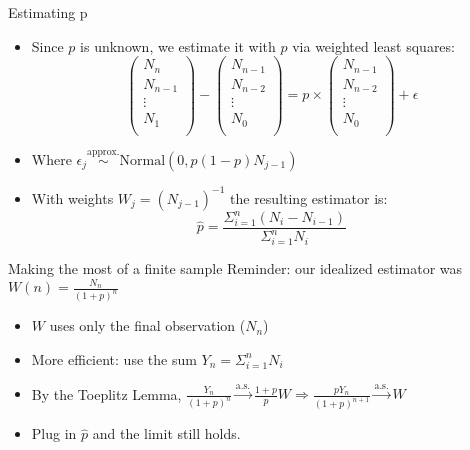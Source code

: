 \documentclass{beamer}
\begin{document}
\begin{frame}{Estimating p}
  \begin{itemize}
    \item Since $p$ is unknown, we estimate it with $\hat{p}$ via weighted least squares:
\[
\begin{pmatrix}
N_n\\
N_{n-1}\\
\vdots\\
N_1\\
\end{pmatrix}
 - 
\begin{pmatrix}
N_{n-1}\\
N_{n-2}\\
\vdots\\
N_0\\
\end{pmatrix}
 = p \times
\begin{pmatrix}
N_{n-1}\\
N_{n-2}\\
\vdots\\
N_0\\
\end{pmatrix}
 + \epsilon
\]
\item Where $\epsilon_j \stackrel{\text{approx.}}{\sim} \text{Normal}(0, p(1-p) N_{j-1})$
\vspace{2mm}
\item With weights $W_j = (N_{j-1})^{-1}$ the resulting estimator is:
\[
\hat{p} = \frac{\Sigma_{i=1}^n (N_i - N_{i-1})}{\Sigma_{i=1}^n N_i}
\]
  \end{itemize}
\end{frame}


\begin{frame}{Making the most of a finite sample}
Reminder: our idealized estimator was $W(n) = \frac{N_n}{(1+p)^n} $
\vspace{3mm}
  \begin{itemize}
    \item $W$ uses only the final observation ($N_n$)
    \vspace{3mm}
    \item More efficient: use the sum $Y_n = \Sigma_{i=1}^n N_i$
    \vspace{3mm}
    \item By the Toeplitz Lemma, $\frac{Y_n}{(1+p)^n} \stackrel{\text{a.s.}}{\to} \frac{1+p}{p}W \Rightarrow \frac{pY_n}{(1+p)^{n+1}} \stackrel{\text{a.s.}}{\to} W$
    \vspace{3mm}
    \item Plug in $\hat{p}$ and the limit still holds.
  \end{itemize}
\end{frame}
\end{document}
